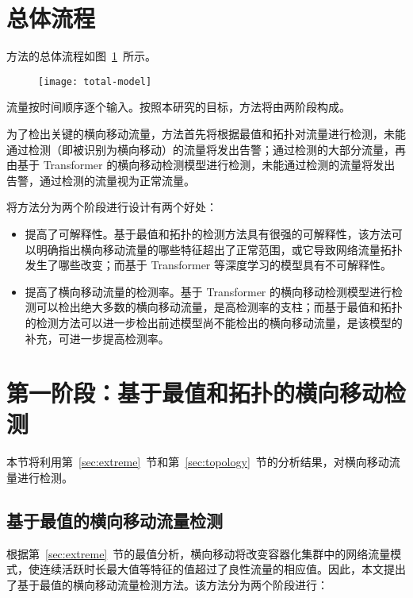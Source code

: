 {\section{总体流程}

方法的总体流程如图~\ref{fig:total-model}~所示。

\begin{figure}[t]
    \centering
    \texttt{[image: total-model]}
    \label{fig:total-model}

\end{figure}

流量按时间顺序逐个输入。按照本研究的目标，方法将由两阶段构成。

为了检出关键的横向移动流量，方法首先将根据最值和拓扑对流量进行检测，未能通过检测（即被识别为横向移动）的流量将发出告警；通过检测的大部分流量，再由基于 Transformer 的横向移动检测模型进行检测，未能通过检测的流量将发出告警，通过检测的流量视为正常流量。

将方法分为两个阶段进行设计有两个好处：

\begin{itemize}
    \item 提高了可解释性。基于最值和拓扑的检测方法具有很强的可解释性，该方法可以明确指出横向移动流量的哪些特征超出了正常范围，或它导致网络流量拓扑发生了哪些改变；而基于 Transformer 等深度学习的模型具有不可解释性\citep{SAEED2023110273}。
    \item 提高了横向移动流量的检测率。基于 Transformer 的横向移动检测模型进行检测可以检出绝大多数的横向移动流量，是高检测率的支柱；而基于最值和拓扑的检测方法可以进一步检出前述模型尚不能检出的横向移动流量，是该模型的补充，可进一步提高检测率。
\end{itemize}

\section{第一阶段：基于最值和拓扑的横向移动检测}

本节将利用第~\ref{sec:extreme}~节和第~\ref{sec:topology}~节的分析结果，对横向移动流量进行检测。

\subsection{基于最值的横向移动流量检测}

根据第~\ref{sec:extreme}~节的最值分析，横向移动将改变容器化集群中的网络流量模式，使连续活跃时长最大值等特征的值超过了良性流量的相应值。因此，本文提出了基于最值的横向移动流量检测方法。该方法分为两个阶段进行：

}
